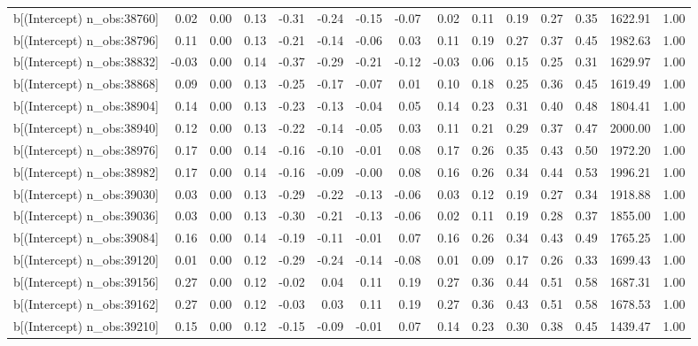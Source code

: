 \begin{table}[ht]
\begin{tabular}{rrrrrrrrrrrrrrr}
  b[(Intercept) n\_obs:38760] & 0.02 & 0.00 & 0.13 & -0.31 & -0.24 & -0.15 & -0.07 & 0.02 & 0.11 & 0.19 & 0.27 & 0.35 & 1622.91 & 1.00 \\ 
  b[(Intercept) n\_obs:38796] & 0.11 & 0.00 & 0.13 & -0.21 & -0.14 & -0.06 & 0.03 & 0.11 & 0.19 & 0.27 & 0.37 & 0.45 & 1982.63 & 1.00 \\ 
  b[(Intercept) n\_obs:38832] & -0.03 & 0.00 & 0.14 & -0.37 & -0.29 & -0.21 & -0.12 & -0.03 & 0.06 & 0.15 & 0.25 & 0.31 & 1629.97 & 1.00 \\ 
  b[(Intercept) n\_obs:38868] & 0.09 & 0.00 & 0.13 & -0.25 & -0.17 & -0.07 & 0.01 & 0.10 & 0.18 & 0.25 & 0.36 & 0.45 & 1619.49 & 1.00 \\ 
  b[(Intercept) n\_obs:38904] & 0.14 & 0.00 & 0.13 & -0.23 & -0.13 & -0.04 & 0.05 & 0.14 & 0.23 & 0.31 & 0.40 & 0.48 & 1804.41 & 1.00 \\ 
  b[(Intercept) n\_obs:38940] & 0.12 & 0.00 & 0.13 & -0.22 & -0.14 & -0.05 & 0.03 & 0.11 & 0.21 & 0.29 & 0.37 & 0.47 & 2000.00 & 1.00 \\ 
  b[(Intercept) n\_obs:38976] & 0.17 & 0.00 & 0.14 & -0.16 & -0.10 & -0.01 & 0.08 & 0.17 & 0.26 & 0.35 & 0.43 & 0.50 & 1972.20 & 1.00 \\ 
  b[(Intercept) n\_obs:38982] & 0.17 & 0.00 & 0.14 & -0.16 & -0.09 & -0.00 & 0.08 & 0.16 & 0.26 & 0.34 & 0.44 & 0.53 & 1996.21 & 1.00 \\ 
  b[(Intercept) n\_obs:39030] & 0.03 & 0.00 & 0.13 & -0.29 & -0.22 & -0.13 & -0.06 & 0.03 & 0.12 & 0.19 & 0.27 & 0.34 & 1918.88 & 1.00 \\ 
  b[(Intercept) n\_obs:39036] & 0.03 & 0.00 & 0.13 & -0.30 & -0.21 & -0.13 & -0.06 & 0.02 & 0.11 & 0.19 & 0.28 & 0.37 & 1855.00 & 1.00 \\ 
  b[(Intercept) n\_obs:39084] & 0.16 & 0.00 & 0.14 & -0.19 & -0.11 & -0.01 & 0.07 & 0.16 & 0.26 & 0.34 & 0.43 & 0.49 & 1765.25 & 1.00 \\ 
  b[(Intercept) n\_obs:39120] & 0.01 & 0.00 & 0.12 & -0.29 & -0.24 & -0.14 & -0.08 & 0.01 & 0.09 & 0.17 & 0.26 & 0.33 & 1699.43 & 1.00 \\ 
  b[(Intercept) n\_obs:39156] & 0.27 & 0.00 & 0.12 & -0.02 & 0.04 & 0.11 & 0.19 & 0.27 & 0.36 & 0.44 & 0.51 & 0.58 & 1687.31 & 1.00 \\ 
  b[(Intercept) n\_obs:39162] & 0.27 & 0.00 & 0.12 & -0.03 & 0.03 & 0.11 & 0.19 & 0.27 & 0.36 & 0.43 & 0.51 & 0.58 & 1678.53 & 1.00 \\ 
  b[(Intercept) n\_obs:39210] & 0.15 & 0.00 & 0.12 & -0.15 & -0.09 & -0.01 & 0.07 & 0.14 & 0.23 & 0.30 & 0.38 & 0.45 & 1439.47 & 1.00 \\ 

\end{tabular}
\end{table}
